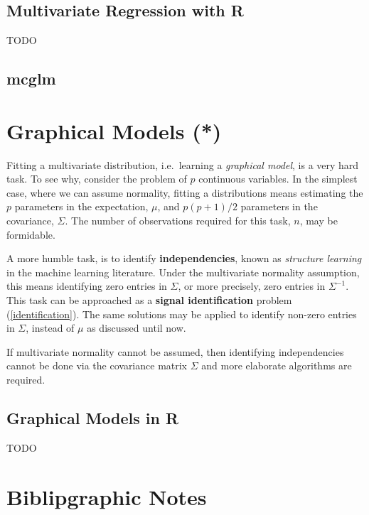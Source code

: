 \documentclass[]{book}
\theoremstyle{definition}
\theoremstyle{definition}
\theoremstyle{definition}
\theoremstyle{remark}
\begin{document}
\subsection{Multivariate Regression with
R}\label{multivariate-regression-with-r}

TODO

\subsection{mcglm}\label{mcglm}

\citet{bonat2018multiple}

\section{Graphical Models (*)}\label{graphical-models}

Fitting a multivariate distribution, i.e.~learning a \emph{graphical
model}, is a very hard task. To see why, consider the problem of \(p\)
continuous variables. In the simplest case, where we can assume
normality, fitting a distributions means estimating the \(p\) parameters
in the expectation, \(\mu\), and \(p(p+1)/2\) parameters in the
covariance, \(\Sigma\). The number of observations required for this
task, \(n\), may be formidable.

A more humble task, is to identify \textbf{independencies}, known as
\emph{structure learning} in the machine learning literature. Under the
multivariate normality assumption, this means identifying zero entries
in \(\Sigma\), or more precisely, zero entries in \(\Sigma^{-1}\). This
task can be approached as a \textbf{signal identification} problem
(\ref{identification}). The same solutions may be applied to identify
non-zero entries in \(\Sigma\), instead of \(\mu\) as discussed until
now.

If multivariate normality cannot be assumed, then identifying
independencies cannot be done via the covariance matrix \(\Sigma\) and
more elaborate algorithms are required.

\subsection{Graphical Models in R}\label{graphical-models-in-r}

TODO

\section{Biblipgraphic Notes}\label{biblipgraphic-notes}
\end{document}
